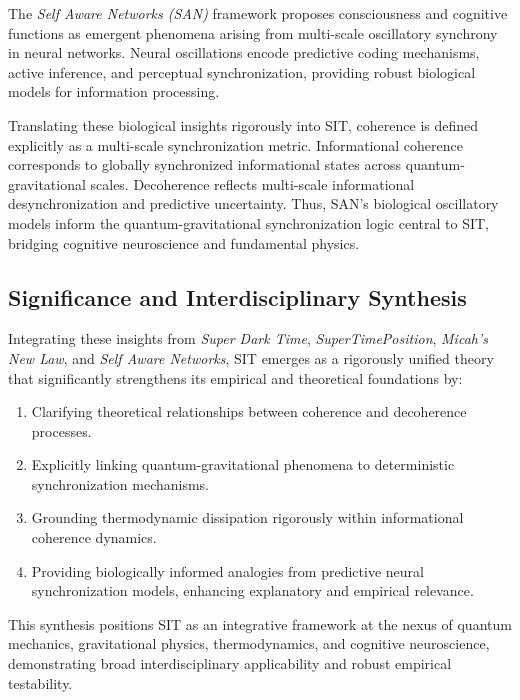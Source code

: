The \textit{Self Aware Networks (SAN)} framework proposes consciousness and cognitive functions as emergent phenomena arising from multi-scale oscillatory synchrony in neural networks. Neural oscillations encode predictive coding mechanisms, active inference, and perceptual synchronization, providing robust biological models for information processing.

Translating these biological insights rigorously into SIT, coherence is defined explicitly as a multi-scale synchronization metric. Informational coherence corresponds to globally synchronized informational states across quantum-gravitational scales. Decoherence reflects multi-scale informational desynchronization and predictive uncertainty. Thus, SAN's biological oscillatory models inform the quantum-gravitational synchronization logic central to SIT, bridging cognitive neuroscience and fundamental physics.

\subsection{Significance and Interdisciplinary Synthesis}

Integrating these insights from \textit{Super Dark Time}, \textit{SuperTimePosition}, \textit{Micah's New Law}, and \textit{Self Aware Networks}, SIT emerges as a rigorously unified theory that significantly strengthens its empirical and theoretical foundations by:

\begin{enumerate}
    \item Clarifying theoretical relationships between coherence and decoherence processes.
    \item Explicitly linking quantum-gravitational phenomena to deterministic synchronization mechanisms.
    \item Grounding thermodynamic dissipation rigorously within informational coherence dynamics.
    \item Providing biologically informed analogies from predictive neural synchronization models, enhancing explanatory and empirical relevance.
\end{enumerate}

This synthesis positions SIT as an integrative framework at the nexus of quantum mechanics, gravitational physics, thermodynamics, and cognitive neuroscience, demonstrating broad interdisciplinary applicability and robust empirical testability.

